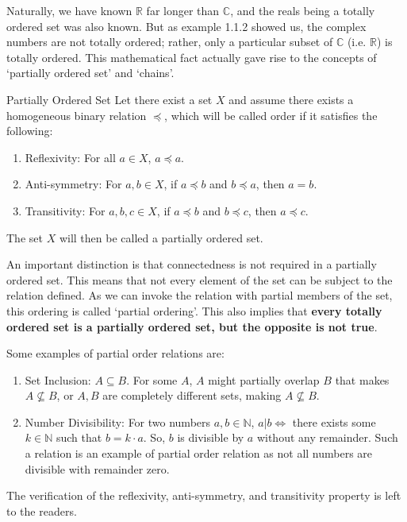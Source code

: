 \noindent Naturally, we have known \(\mathbb{R}\) far longer than \(\mathbb{C}\), and the reals being a totally ordered set was also known. But as example 1.1.2 showed us, the complex numbers are not totally ordered; rather, only a particular subset of \(\mathbb{C}\) (i.e. \(\mathbb{R}\)) is totally ordered. This mathematical fact actually gave rise to the concepts of `partially ordered set' and `chains'.
\begin{Definition}{Partially Ordered Set}\label{partially_ordered_set}
    Let there exist a set $X$ and assume there exists a homogeneous binary relation $\preceq$, which will be called order if it satisfies the following:
    \begin{enumerate}
        \item Reflexivity: For all $a\in X$, $a\preceq a$.
        \item Anti-symmetry: For $a,b\in X$, if $a\preceq b$ and $b\preceq a$, then $a=b$.
        \item Transitivity: For $a,b,c\in X$, if $a\preceq b$ and $b\preceq c$, then $a\preceq c$.
    \end{enumerate}
    The set $X$ will then be called a partially ordered set.
\end{Definition}
\noindent An important distinction is that connectedness is not required in a partially ordered set. This means that not every element of the set can be subject to the relation defined. As we can invoke the relation with partial members of the set, this ordering is called `partial ordering'. This also implies that \textbf{every totally ordered set is a partially ordered set, but the opposite is not true}.
\begin{Example}\label{example_of_partial_order}
    Some examples of partial order relations are:
    \begin{enumerate}
        \item Set Inclusion: $A\subseteq B$. For some $A$, $A$ might partially overlap $B$ that makes $A\nsubseteq B$, or $A, B$ are completely different sets, making $A\nsubseteq B$.
        \item Number Divisibility: For two numbers $a,b\in\mathbb{N}$, $a|b\iff$ there exists some $k\in\mathbb{N}$ such that $b=k\cdot a$. So, $b$ is divisible by $a$ without any remainder. Such a relation is an example of partial order relation as not all numbers are divisible with remainder zero.
    \end{enumerate}
    The verification of the reflexivity, anti-symmetry, and transitivity property is left to the readers.
\end{Example}
